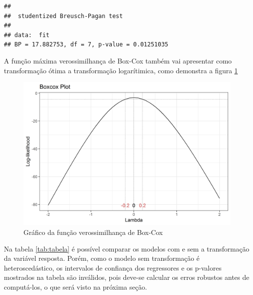 \documentclass[a4paper]{article}
\begin{document}
\begin{verbatim}
## 
##  studentized Breusch-Pagan test
## 
## data:  fit
## BP = 17.882753, df = 7, p-value = 0.01251035
\end{verbatim}

A função máxima verossimilhança de Box-Cox também vai apresentar como
transformação ótima a transformação logarítimica, como demonstra a
figura \ref{fig:boxcox}

\begin{figure}[H]

{\centering \includegraphics[width=0.5\linewidth]{images/boxcox-1} 

}

\caption{Gráfico da função verossimilhança de Box-Cox}\label{fig:boxcox}
\end{figure}

Na tabela \ref{tab:tabela} é possível comparar os modelos com e sem a
transformação da variável resposta. Porém, como o modelo sem
transformação é heteroscedástico, os intervalos de confiança dos
regressores e os p-valores mostrados na tabela são inválidos, pois
deve-se calcular os erros robustos antes de computá-los, o que será
visto na próxima seção.
\end{document}
